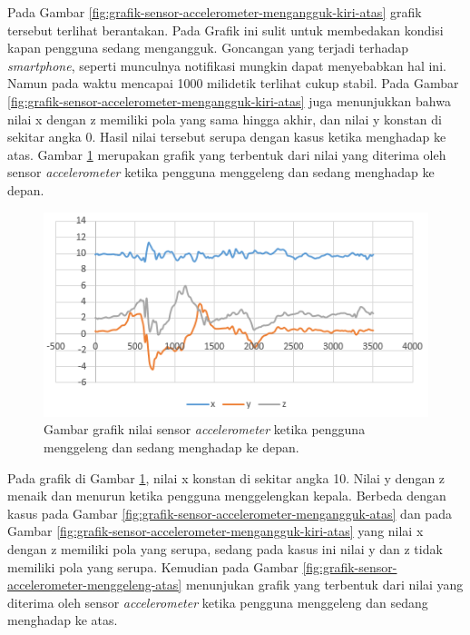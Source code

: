 Pada Gambar \ref{fig:grafik-sensor-accelerometer-mengangguk-kiri-atas} grafik tersebut terlihat berantakan. Pada Grafik ini sulit untuk membedakan kondisi kapan pengguna sedang mengangguk. Goncangan yang terjadi terhadap \textit{smartphone}, seperti munculnya notifikasi mungkin dapat menyebabkan hal ini. Namun pada waktu mencapai 1000 milidetik terlihat cukup stabil. Pada Gambar \ref{fig:grafik-sensor-accelerometer-mengangguk-kiri-atas} juga menunjukkan bahwa nilai x dengan z memiliki pola yang sama hingga akhir, dan nilai y konstan di sekitar angka 0. Hasil nilai tersebut serupa dengan kasus ketika menghadap ke atas. Gambar \ref{fig:grafik-sensor-accelerometer-menggeleng-depan} merupakan grafik yang terbentuk dari nilai yang diterima oleh sensor \textit{accelerometer} ketika pengguna menggeleng dan sedang menghadap ke depan.

\begin{figure}[htbp]
\centering
\includegraphics[scale=1]{Gambar/grafik-sensor-accelerometer-menggeleng-depan.png}
\caption{Gambar grafik nilai sensor \textit{accelerometer} ketika pengguna menggeleng dan sedang menghadap ke depan.} 
\label{fig:grafik-sensor-accelerometer-menggeleng-depan}
\end{figure}

Pada grafik di Gambar \ref{fig:grafik-sensor-accelerometer-menggeleng-depan}, nilai x konstan di sekitar angka 10. Nilai y dengan z menaik dan menurun ketika pengguna menggelengkan kepala. Berbeda dengan kasus pada Gambar \ref{fig:grafik-sensor-accelerometer-mengangguk-atas} dan pada Gambar \ref{fig:grafik-sensor-accelerometer-mengangguk-kiri-atas} yang nilai x dengan z memiliki pola yang serupa, sedang pada kasus ini nilai y dan z tidak memiliki pola yang serupa. Kemudian pada Gambar \ref{fig:grafik-sensor-accelerometer-menggeleng-atas} menunjukan grafik yang terbentuk dari nilai yang diterima oleh sensor \textit{accelerometer} ketika pengguna menggeleng dan sedang menghadap ke atas.

